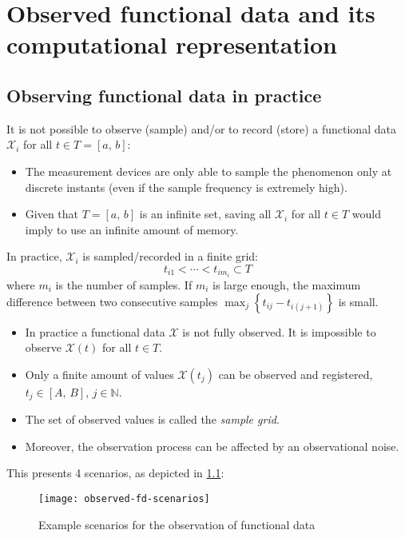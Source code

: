 \chapter{Observed functional data and its computational representation}

\section{Observing functional data in practice}

It is not possible to observe (sample) and/or to record (store)
a functional data $\mathcal X_i$ for all $t\in T=[a,\,b]$:
\begin{itemize}
	\item The measurement devices are only able to sample the phenomenon
	      only at discrete instants (even if the sample frequency is extremely high).
	\item Given that $T = [a,\,b]$ is an infinite set, saving all
	      $\mathcal X_i$ for all $t\in T$ would imply to use an infinite amount of memory.
\end{itemize}

In practice, $\mathcal X_i$ is sampled/recorded in a finite grid:
\begin{equation*}
	t_{i1} < \cdots < t_{im_i} \subset T
\end{equation*}
where $m_i$ is the number of samples. If $m_i$ is large enough,
the maximum difference between two consecutive samples
$\max_j\left\{t_{ij} - t_{i(j+1)}\right\}$ is small.

\begin{recap}{}{}
    \begin{itemize}
        \item In practice a functional data $\mathcal X$ is not fully observed.
            It is impossible to observe $\mathcal X(t)$ for all $t\in T$.
        \item Only a finite amount of values $\mathcal X(t_j)$ can be observed
            and registered, $t_j \in [A,\,B],\,j\in\mathds N$.

        \item The set of observed values is called the \emph{sample grid}.
        \item Moreover, the observation process can be affected by an observational noise.
    \end{itemize}
\end{recap}

This presents 4 scenarios, as depicted in \cref{fig:observed-fd-scenarios}:
\begin{figure}[H]
	\texttt{[image: observed-fd-scenarios]}
	\caption{Example scenarios for the observation of functional data}
	\label{fig:observed-fd-scenarios}
\end{figure}

